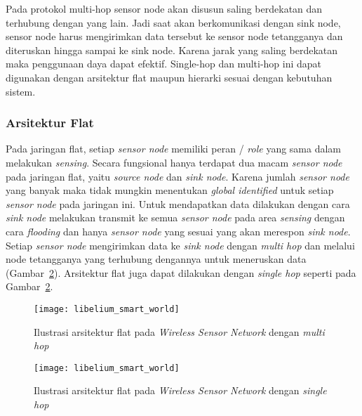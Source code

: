 Pada protokol multi-hop sensor node akan disusun saling berdekatan dan terhubung dengan yang lain. Jadi saat akan berkomunikasi dengan sink node, sensor node harus mengirimkan data tersebut ke sensor node tetangganya dan diteruskan hingga sampai ke sink node. Karena jarak yang saling berdekatan maka penggunaan daya dapat efektif. Single-hop dan multi-hop ini dapat digunakan dengan arsitektur flat maupun hierarki sesuai dengan kebutuhan sistem.


\subsubsection{Arsitektur Flat}
Pada jaringan flat, setiap \textit{sensor node} memiliki peran / \textit{role} yang sama dalam melakukan \textit{sensing}. Secara fungsional hanya terdapat dua macam \textit{sensor node} pada jaringan flat, yaitu \textit{source node} dan \textit{sink node}. Karena jumlah \textit{sensor node} yang banyak maka tidak mungkin menentukan \textit{global identified} untuk setiap \textit{sensor node} pada jaringan ini. Untuk mendapatkan data dilakukan dengan cara \textit{sink node} melakukan transmit ke semua \textit{sensor node} pada area \textit{sensing} dengan cara \textit{flooding} dan hanya \textit{sensor node} yang sesuai yang akan merespon \textit{sink node}. Setiap \textit{sensor node} mengirimkan data ke \textit{sink node} dengan \textit{multi hop} dan melalui node tetangganya yang terhubung dengannya untuk meneruskan data (Gambar~\ref{fig:libelium_smart_world}). Arsitektur flat juga dapat dilakukan dengan \textit{single hop} seperti pada Gambar~\ref{fig:libelium_smart_world}.
\begin{figure} [H]
	\centering  
	\texttt{[image: libelium\_smart\_world]}  
	\caption[Ilustrasi arsitektur flat pada \textit{Wireless Sensor Network} dengan \textit{multi hop}]{Ilustrasi arsitektur flat pada \textit{Wireless Sensor Network} dengan \textit{multi hop}} 
	\label{fig:libelium_smart_world} 
\end{figure} 
\begin{figure} [H]
	\centering  
	\texttt{[image: libelium\_smart\_world]}  
	\caption[Ilustrasi arsitektur flat pada \textit{Wireless Sensor Network} dengan \textit{single hop}]{Ilustrasi arsitektur flat pada \textit{Wireless Sensor Network} dengan \textit{single hop}} 
	\label{fig:libelium_smart_world} 
\end{figure} 

